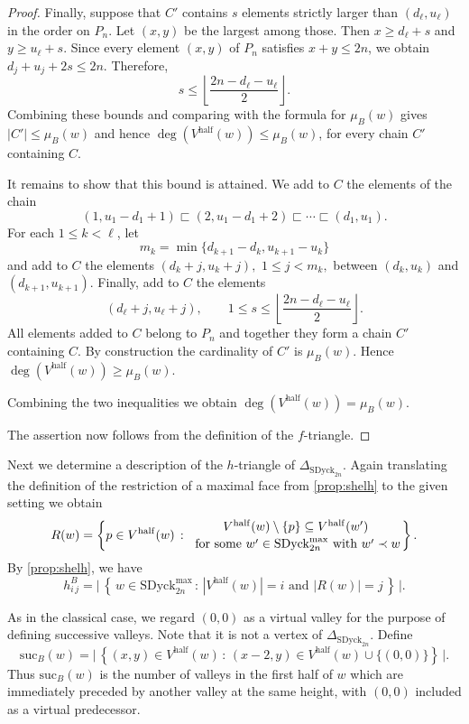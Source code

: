 \documentclass[11pt]{amsart}
\def\half{\mathrm{half}}
\def\SDyck{\mathrm{SDyck}}
\def\suc{\mathrm{suc}}
\theoremstyle{plain}
\numberwithin{lemma}{\DefaultNumberTheoremWithin}
\numberwithin{theorem}{\DefaultNumberTheoremWithin}
\numberwithin{corollary}{\DefaultNumberTheoremWithin}
\numberwithin{proposition}{\DefaultNumberTheoremWithin}
\numberwithin{conjecture}{\DefaultNumberTheoremWithin}
\theoremstyle{definition}
\numberwithin{definition}{\DefaultNumberTheoremWithin}
\numberwithin{question}{\DefaultNumberTheoremWithin}
\numberwithin{problem}{\DefaultNumberTheoremWithin}
\theoremstyle{remark}
\numberwithin{remark}{\DefaultNumberTheoremWithin}
\numberwithin{example}{\DefaultNumberTheoremWithin}
\numberwithin{claim}{\DefaultNumberTheoremWithin}
\begin{document}
\begin{proof}
Finally, suppose that $C'$ contains $s$ elements strictly
larger than $(d_\ell,u_\ell)$ in the order on $P_n$. 
Let $(x,y)$ be the largest among those. 
Then $x \geq d_\ell+s$ and $y \geq u_\ell+s$. 
Since every element $(x,y)$ of $P_n$ satisfies $x+y\leq2n$, we obtain
$d_j+u_j+2s\leq2n.$
Therefore,
\[
s\leq
\left\lfloor
\frac{2n-d_\ell-u_\ell}{2}
\right\rfloor.
\]
Combining these bounds and comparing with the formula for $\mu_B(w)$ gives
$|C'|\leq\mu_B(w)$ and hence $\deg(V^ {\half}(w)) \leq \mu_B(w)$,
for every chain $C'$ containing $C$.

It remains to show that this bound is attained. We add to $C$ the
elements of the chain
\[
(1,u_1-d_1+1)
\sqsubset
(2,u_1-d_1+2)
\sqsubset\cdots\sqsubset
(d_1,u_1).
\]
For each $1\leq k<\ell$, let
\[
m_k=
\min\{d_{k+1}-d_k,u_{k+1}-u_k\}
\]
and add to $C$ the elements
$(d_k+j,u_k+j),$
$1\leq j<m_k,$
between $(d_k,u_k)$ and $(d_{k+1},u_{k+1})$. 
Finally, add to $C$ the elements
\[
(d_\ell+j,u_\ell+j),
\qquad
1\leq s\leq
\left\lfloor
\frac{2n-d_\ell-u_\ell}{2}
\right\rfloor.
\]
All elements added to $C$ belong to $P_n$ and together they form a
chain $C'$ containing $C$. By construction the cardinality 
of $C'$ is $\mu_B(w)$. Hence $\deg(V^ {\half}(w)) \geq \mu_B(w)$. 

Combining the two inequalities we obtain
$\deg(V^ {\half}(w)) = \mu_B(w)$.

The assertion now follows from the definition of
the $f$-triangle.
\end{proof}

Next we determine a description of the $h$-triangle of
$\Delta_{\SDyck_{2n}}$.
Again translating the definition of the restriction of a maximal face from \ref{prop:shelh} to the given setting we obtain
\[
R(w)
=
\left\{
p\in V^{\half}(w)
\,:\,
\genfrac{}{}{0pt}{}{V^{\half}(w)\setminus\{p\}
\subseteq V^{\half}(w')}{
\text{ for some }
w'\in\SDyck_{2n}^{\max}
\text{ with } w'\prec w}
\right\}.
\]
By \ref{prop:shelh}, we have
\[
h^B_{i\,j}
=
\Big|\,\left\{\,
w\in\SDyck_{2n}^{\max}
\,:\,
|V^{\half}(w)|=i \text{ and } |R(w)|=j\,
\right\}\,\Big|.
\]

As in the classical case, we regard $(0,0)$ as a virtual valley for the purpose of 
defining successive valleys. Note that it is not a vertex of
$\Delta_{\SDyck_{2n}}$. Define
\[
\suc_B(w)
=
\Big|\,\left\{
(x,y)\in V^{\half}(w)
\,:\,
(x-2,y)\in V^{\half}(w)\cup\{(0,0)\}
\right\}\,\Big|.
\]
Thus $\suc_B(w)$ is the number of valleys in the first half of $w$ which are
immediately preceded by another valley at the same height, with
$(0,0)$ included as a virtual predecessor.
\end{document}

